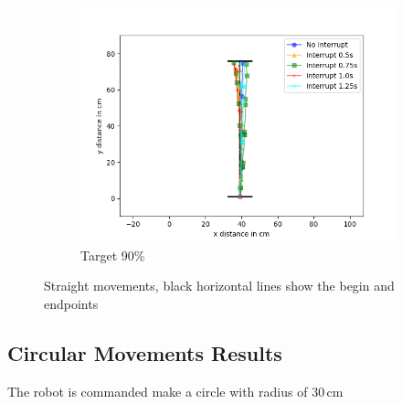 \begin{figure}
\begin{subfigure}[b]{0.62\textwidth}
		\includegraphics[width=\textwidth]{pics/straight_90.png}
		\caption{Target 90\%}
		\label{fig:stra_exp3}
	\end{subfigure}
	\caption{Straight movements, black horizontal lines show the begin and endpoints}
\end{figure}


\subsection{Circular Movements Results}

The robot is commanded make a circle with radius of 30\,cm


